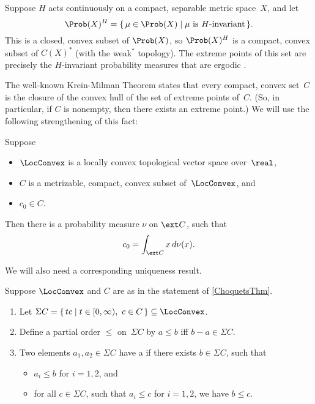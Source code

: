 \begin{eg}
Suppose $H$ acts continuously on a compact, separable metric space~$X$, and let 
	$$\Prob(X)^H = \{\, \mu \in \Prob(X) \mid \text{$\mu$ is $H$-invariant} \,\} . $$ 
This is a closed, convex subset of $\Prob(X)$, so $\Prob(X)^H$ is a compact, convex subset of $C(X)^*$ (with the weak$^*$ topology). The extreme points of this set are precisely the $H$-invariant probability measures that are ergodic .
\end{eg}

The well-known Krein-Milman Theorem states that every compact, convex set~$C$ is the closure of the convex hull of the set of extreme points of~$C$. (So, in particular, if $C$ is nonempty, then there exists an extreme point.) We will use the following strengthening of this fact:

\begin{thm} \label{ChoquetsThm}
Suppose 
\noprelistbreak
	\begin{itemize}
	\item $\LocConvex$ is a locally convex topological vector space over~$\real$,
	\item $C$ is a metrizable, compact, convex subset of~$\LocConvex$, 
	and 
	\item $c_0 \in C$.
	\end{itemize}
Then there is a probability measure $\nu$ on $\ext C$, such that
	$$ c_0 = \int_{\ext C} x \, d\nu(x) .$$
\end{thm}

We will also need a corresponding uniqueness result.

\begin{defns}[(Choquet)]
Suppose $\LocConvex$ and $C$ are as in the statement of \cref{ChoquetsThm}. 
\noprelistbreak
	\begin{enumerate}
	\item Let \nindex{$\Sigma C = \{\, t c \mid t \in [0,\infty), \ c \in C \,\}$}%
	$\Sigma C = \{\, t c \mid t \in [0,\infty), \ c \in C \,\} \subseteq \LocConvex$.
	\item Define a partial order $\le$ on~$\Sigma C$ by $a \le b$ iff $b - a \in \Sigma C$.
	\item Two elements $a_1,a_2 \in \Sigma C$ have a  if there exists $b \in \Sigma C$, such that
		\begin{itemize}
		\item $a_i \le b$ for $i = 1,2$,
		and
		\item for all $c \in \Sigma C$, such that $a_i \le c$ for $i = 1,2$, we have $b \le c$.
		\end{itemize}
	\end{enumerate}
\end{defns}

